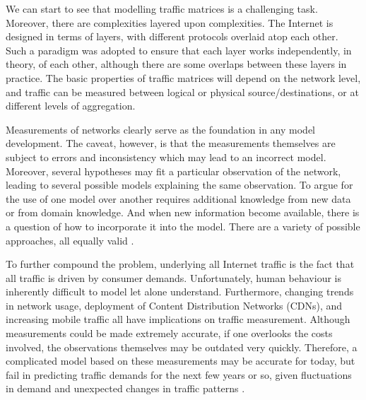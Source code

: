 
We can start to see that modelling traffic matrices is a challenging
task. Moreover, there are complexities layered upon complexities. The
Internet is designed in terms of layers, with different protocols
overlaid atop each other. Such a paradigm was adopted to ensure that
each layer works independently, in theory, of each other, although
there are some overlaps between these layers in practice.  The basic
properties of traffic matrices will depend on the network level, and
traffic can be measured between logical or physical
source/destinations, or at different levels of aggregation.

Measurements of networks clearly serve as the foundation in any model
development. The caveat, however, is that the measurements themselves
are subject to errors and inconsistency which may lead to an incorrect
model. Moreover, several hypotheses may fit a particular observation
of the network, leading to several possible models explaining the same
observation. To argue for the use of one model over another requires
additional knowledge from new data or from domain knowledge. And when
new information become available, there is a question of how to
incorporate it into the model. There are a variety of possible
approaches, all equally valid \cite{Alderson06Topology}.

To further compound the problem, underlying all Internet traffic is 
the fact that all traffic is driven by consumer demands. Unfortunately, 
human behaviour is inherently difficult to model let
alone understand. Furthermore, changing trends in network usage,
deployment of Content Distribution Networks (CDNs), and increasing mobile traffic
all have implications on traffic measurement. Although measurements could be
made extremely accurate, if one overlooks the costs involved, 
the observations themselves may be outdated very quickly. 
Therefore, a complicated model based on these measurements
may be accurate for today, but
fail in predicting traffic demands for the next few years or so, given
fluctuations in demand and unexpected changes in traffic patterns
\cite{Teixeira04PotatoSIG}.  

